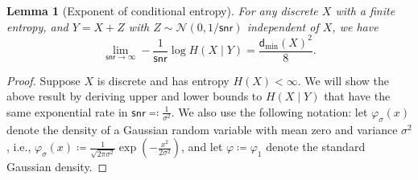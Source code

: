 \documentclass[11pt]{article}
\newcommand{\calN}{\mathcal{N}}
\newcommand{\snr}{\mathsf{snr}}
\newcommand{\dmin}{\mathsf{d}_{\min}}
\newtheorem{lemma}{Lemma}
\begin{document}
	
	\begin{lemma}[Exponent of conditional entropy] For any discrete $X$ with a finite entropy, and $Y = X + Z$ with $Z \sim \calN(0,1/\snr)$ independent of $X$, we have
		\begin{equation*}
			\lim_{\snr \to \infty} - \frac{1}{\snr} \log H(X \mid Y) = \frac{\dmin(X)^2}{8}.
		\end{equation*} \label{lem: cond_ent}
	\end{lemma}
	\begin{proof}[Proof]
		Suppose $X$ is discrete and has entropy $H(X) < \infty$. We will show the above result by deriving upper and lower bounds to $H(X \mid Y)$ that have the same exponential rate in $\snr \eqqcolon \frac{1}{\sigma^2}$. 
		We also use the following notation: let $\varphi_{\sigma}(x)$ denote the density of a Gaussian random variable with mean zero and variance $\sigma^2$, i.e., $\varphi_{\sigma}(x) \coloneqq \frac{1}{\sqrt{2\pi\sigma^2}} \exp(-\frac{x^2}{2\sigma^2})$, and let $\varphi \coloneqq \varphi_1$ denote the standard Gaussian density.
		

\end{proof}
\end{document}
